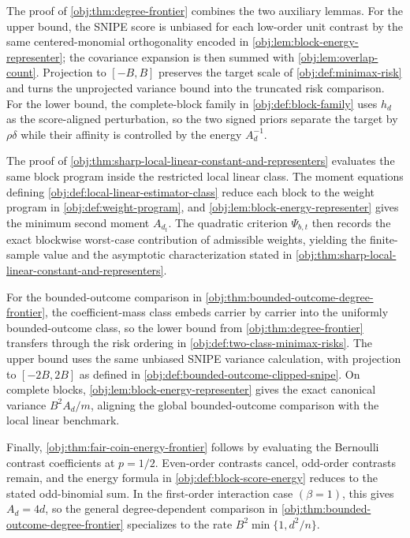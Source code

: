 The proof of \cref{obj:thm:degree-frontier} combines the two auxiliary lemmas. For the upper bound, the SNIPE score is unbiased for each low-order unit contrast by the same centered-monomial orthogonality encoded in \cref{obj:lem:block-energy-representer}; the covariance expansion is then summed with \cref{obj:lem:overlap-count}. Projection to \([-B,B]\) preserves the target scale of \cref{obj:def:minimax-risk} and turns the unprojected variance bound into the truncated risk comparison. For the lower bound, the complete-block family in \cref{obj:def:block-family} uses \(h_d\) as the score-aligned perturbation, so the two signed priors separate the target by \(\rho\delta\) while their affinity is controlled by the energy \(A_d^{-1}\).

The proof of \cref{obj:thm:sharp-local-linear-constant-and-representers} evaluates the same block program inside the restricted local linear class. The moment equations defining \cref{obj:def:local-linear-estimator-class} reduce each block to the weight program in \cref{obj:def:weight-program}, and \cref{obj:lem:block-energy-representer} gives the minimum second moment \(A_{d_t}\). The quadratic criterion \(\Psi_{b,t}\) then records the exact blockwise worst-case contribution of admissible weights, yielding the finite-sample value and the asymptotic characterization stated in \cref{obj:thm:sharp-local-linear-constant-and-representers}.

For the bounded-outcome comparison in \cref{obj:thm:bounded-outcome-degree-frontier}, the coefficient-mass class embeds carrier by carrier into the uniformly bounded-outcome class, so the lower bound from \cref{obj:thm:degree-frontier} transfers through the risk ordering in \cref{obj:def:two-class-minimax-risks}. The upper bound uses the same unbiased SNIPE variance calculation, with projection to \([-2B,2B]\) as defined in \cref{obj:def:bounded-outcome-clipped-snipe}. On complete blocks, \cref{obj:lem:block-energy-representer} gives the exact canonical variance \(B^2A_d/m\), aligning the global bounded-outcome comparison with the local linear benchmark.

Finally, \cref{obj:thm:fair-coin-energy-frontier} follows by evaluating the Bernoulli contrast coefficients at \(p=1/2\). Even-order contrasts cancel, odd-order contrasts remain, and the energy formula in \cref{obj:def:block-score-energy} reduces to the stated odd-binomial sum. In the first-order interaction case \((\beta=1)\), this gives \(A_d=4d\), so the general degree-dependent comparison in \cref{obj:thm:bounded-outcome-degree-frontier} specializes to the rate \(B^2\min\{1,d^2/n\}\).
